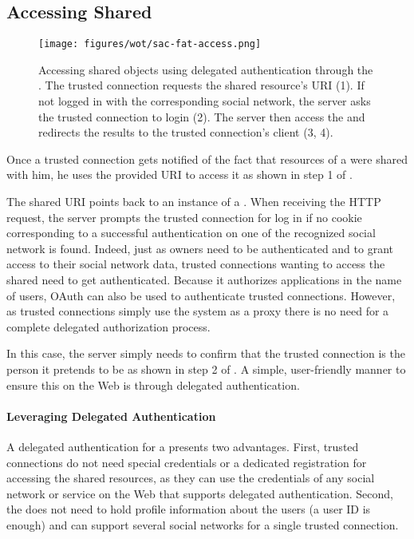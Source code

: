 \subsection{Accessing Shared \stsBig{}}\label{sac-accessing}
\begin{figure}[!htb]
\centering
\texttt{[image: figures/wot/sac-fat-access.png]}
\caption{Accessing shared objects using delegated authentication through the \sacLong{}. The trusted connection requests the shared resource's URI (1). If not logged in with the corresponding social network, the \sac{} server asks the trusted connection to login (2). The \sac{} server then access the \st{} and redirects the results to the trusted connection's client (3, 4).}
\label{fig:sac-access}
\end{figure}
Once a trusted connection gets notified of the fact that resources of a \st{} were shared with him, he uses the provided URI to access it as shown in step 1 of .

The shared URI points back to an instance of a \sac{}. When receiving the HTTP request, the \sac{} server prompts the trusted connection for log in if no cookie corresponding to a successful authentication on one of the \sac{} recognized social network is found. Indeed, just as \st{} owners need to be authenticated and to grant access to their social network data, trusted connections wanting to access the shared \sts{} need to get authenticated. Because it authorizes applications in the name of users, OAuth can also be used to authenticate trusted connections. However, as trusted connections simply use the system as a proxy there is no need for a complete delegated authorization process.

In this case, the \sac{} server simply needs to confirm that the trusted connection is the person it pretends to be as shown in step 2 of . A simple, user-friendly manner to ensure this on the Web is through delegated authentication.

\paragraph{Leveraging Delegated Authentication}
A delegated authentication for a \sac{} presents two advantages. First, trusted connections do not need special credentials or a dedicated registration for accessing the shared resources, as they can use the credentials of any social network or service on the Web that supports delegated authentication. Second, the \sac{} does not need to hold profile information about the users (a user ID is enough) and can support several social networks for a single trusted connection. 

